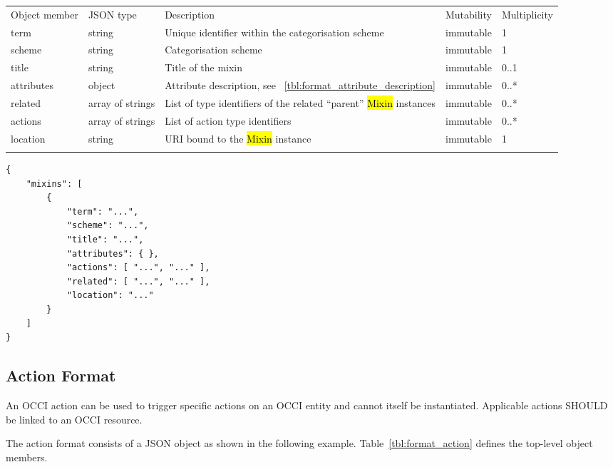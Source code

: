 \documentclass[10pt,a4paper]{article}
\begin{document}
 {
    \begin{tabularx}{\textwidth}{llXll}
    \toprule
    Object member & JSON type & Description & Mutability & Multiplicity \\
    \colrule
    term & string & Unique identifier within the categorisation scheme &
immutable & 1 \\
    scheme & string & Categorisation scheme & immutable & 1 \\
    title & string & Title of the mixin & immutable & 0..1 \\
    attributes & object & Attribute description, see
~\ref{tbl:format_attribute_description} & immutable & 0..* \\
    related & array of strings & List of type identifiers of the related
``parent''
\hl{Mixin} instances & immutable & 0..* \\
    actions & array of strings & List of action type identifiers & immutable &
0..*
\\
    location & string & URI bound to the \hl{Mixin} instance & immutable
& 1 \\
    \botrule
    \end{tabularx}
}

\begin{verbatim}
{
    "mixins": [
        {
            "term": "...",
            "scheme": "...",
            "title": "...",
            "attributes": { },
            "actions": [ "...", "..." ],
            "related": [ "...", "..." ],
            "location": "..."
        }
    ]
}
\end{verbatim}

\subsection{Action Format}
\label{sec:format_action}

An OCCI action can be used to trigger specific actions on an OCCI entity and
cannot itself be 
instantiated. Applicable actions SHOULD be linked to an OCCI resource. 


The action format consists of a JSON object as shown in the
following example.
Table~\ref{tbl:format_action} defines the top-level object members.
\end{document}
